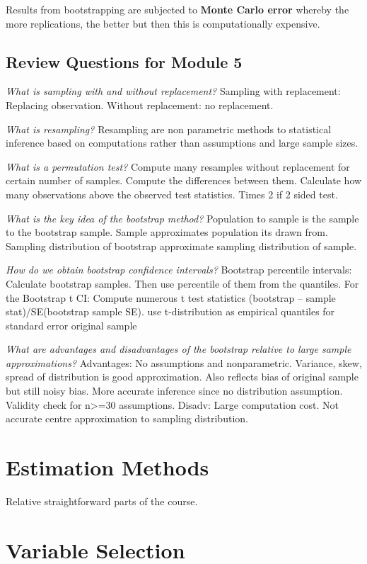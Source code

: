 \documentclass[11pt, oneside]{article}
\theoremstyle{definition}
\begin{document}
Results from bootstrapping are subjected to \textbf{Monte Carlo error} whereby the more replications, the better but then this is computationally expensive.

\subsection{Review Questions for Module 5}
\textit{What is sampling with and without replacement?}
Sampling with replacement: Replacing observation. Without replacement: no replacement.

\textit{What is resampling?}
Resampling are non parametric methods to statistical inference based on computations rather than assumptions and large sample sizes.

\textit{What is a permutation test?}
Compute many resamples without replacement for certain number of samples. Compute the differences between them. Calculate how many observations above the observed test statistics. Times 2 if 2 sided test.

\textit{What is the key idea of the bootstrap method?}
Population to sample is the sample to the bootstrap sample. Sample approximates population its drawn from. Sampling distribution of bootstrap approximate sampling distribution of sample.

\textit{How do we obtain bootstrap confidence intervals?}
Bootstrap percentile intervals: Calculate bootstrap samples. Then use percentile of them from the quantiles. For the Bootstrap t CI: Compute numerous t test statistics (bootstrap – sample stat)/SE(bootstrap sample SE). use t-distribution as empirical quantiles for standard error original sample

\textit{What are advantages and disadvantages of the bootstrap relative to large sample approximations?}
Advantages: No assumptions and nonparametric. Variance, skew, spread of distribution is good approximation. Also reflects bias of original sample but still noisy bias. More accurate inference since no distribution assumption. Validity check for n>=30 assumptions.
Disadv: Large computation cost. Not accurate centre approximation to sampling distribution.

\newpage
\section{Estimation Methods}
Relative straightforward parts of the course.
\section{Variable Selection}
\end{document}
